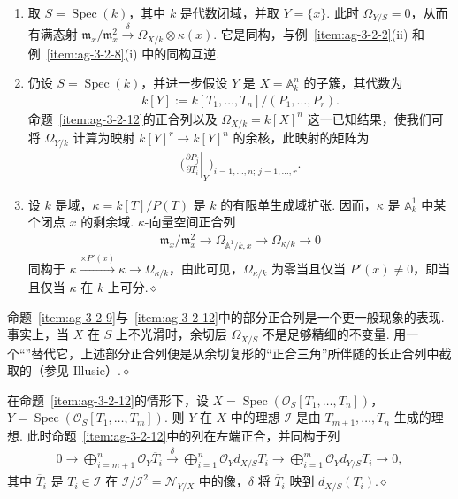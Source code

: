 \begin{example}\label{item:ag-3-2-13}
\begin{enumerate}[label=(\roman*)]
\item 取 $S=\operatorname{Spec}(k)$，其中 $k$ 是代数闭域，并取 $Y=\{x\}$. 此时 $\Omega_{Y/S}=0$，从而有满态射 $\mathfrak m_x/\mathfrak m_x^2\xrightarrow\delta\Omega_{X/k}\otimes\kappa(x)$. 它是同构，与例~\ref{item:ag-3-2-2}(ii) 和例~\ref{item:ag-3-2-8}(i) 中的同构互逆.
\item 仍设 $S=\operatorname{Spec}(k)$，并进一步假设 $Y$ 是 $X=\mathbb A_k^n$ 的子簇，其代数为
\begin{align*}
k[Y]:=k[T_1,\ldots,T_n]/(P_1,\ldots,P_r).
\end{align*}
命题~\ref{item:ag-3-2-12}的正合列以及 $\Omega_{X/k}=k[X]^n$ 这一已知结果，使我们可将 $\Omega_{Y/k}$ 计算为映射 $k[Y]^r\longrightarrow k[Y]^n$ 的余核，此映射的矩阵为
\begin{align*}
\biggl(\left.\frac{\partial P_j}{\partial T_i}\right|_Y\biggr)_{i=1,\ldots,n;\,j=1,\ldots,r}.
\end{align*}
\item 设 $k$ 是域，$\kappa=k[T]/P(T)$ 是 $k$ 的有限单生成域扩张. 因而，$\kappa$ 是 $\mathbb A_k^1$ 中某个闭点 $x$ 的剩余域. $\kappa$-向量空间正合列
\begin{align*}
\mathfrak m_x/\mathfrak m_x^2\longrightarrow\Omega_{\mathbb A^1/k,x}\longrightarrow\Omega_{\kappa/k}\longrightarrow0
\end{align*}
同构于 $\kappa\xrightarrow{\times P'(x)}\kappa\longrightarrow\Omega_{\kappa/k}$，由此可见，$\Omega_{\kappa/k}$ 为零当且仅当 $P'(x)\ne0$，即当且仅当 $\kappa$ 在 $k$ 上可分.\unskip\nobreak\hfill\ensuremath{\diamond}
\end{enumerate}
\renewcommand{\envenddiamond}{}
\end{example}
\begin{remark}\label{item:ag-3-2-14}
命题~\ref{item:ag-3-2-9}与~\ref{item:ag-3-2-12}中的部分正合列是一个更一般现象的表现. 事实上，当 $X$ 在 $S$ 上不光滑时，余切层 $\Omega_{X/S}$ 不是足够精细的不变量. 用一个``''替代它，上述部分正合列便是从余切复形的``正合三角''所伴随的长正合列中截取的（参见 Illusie）.\unskip\nobreak\hfill\ensuremath{\diamond}
\renewcommand{\envenddiamond}{}
\end{remark}
\begin{example}\label{item:ag-3-2-15}
在命题~\ref{item:ag-3-2-12}的情形下，设 $X=\operatorname{Spec}(\mathcal O_S[T_1,\ldots,T_n])$，$Y=\operatorname{Spec}(\mathcal O_S[T_1,\ldots,T_m])$. 则 $Y$ 在 $X$ 中的理想 $\mathcal I$ 是由 $T_{m+1},\ldots,T_n$ 生成的理想. 此时命题~\ref{item:ag-3-2-12}中的列在左端正合，并同构于列
\begin{align*}
0\longrightarrow\bigoplus_{i=m+1}^n\mathcal O_Y\overline T_i
\xrightarrow\delta\bigoplus_{i=1}^n\mathcal O_Yd_{X/S}T_i
\longrightarrow\bigoplus_{i=1}^m\mathcal O_Yd_{Y/S}T_i\longrightarrow0,
\end{align*}
其中 $\overline T_i$ 是 $T_i\in\mathcal I$ 在 $\mathcal I/\mathcal I^2=\mathcal N_{Y/X}$ 中的像，$\delta$ 将 $\overline T_i$ 映到 $d_{X/S}(T_i)$.\unskip\nobreak\hfill\ensuremath{\diamond}
\renewcommand{\envenddiamond}{}
\end{example}
